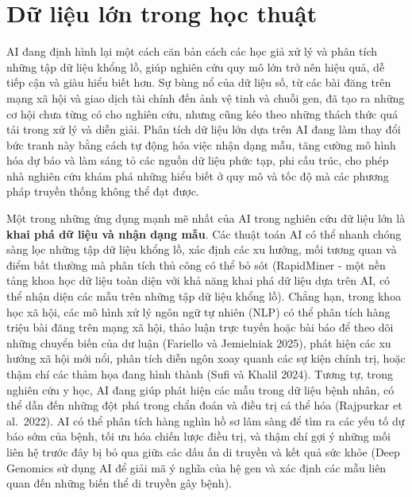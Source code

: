\section{Dữ liệu lớn trong học thuật}

AI đang định hình lại một cách căn bản cách các học giả xử lý và phân tích những tập dữ liệu khổng lồ, giúp nghiên cứu quy mô lớn trở nên hiệu quả, dễ tiếp cận và giàu hiểu biết hơn. Sự bùng nổ của dữ liệu số, từ các bài đăng trên mạng xã hội và giao dịch tài chính đến ảnh vệ tinh và chuỗi gen, đã tạo ra những cơ hội chưa từng có cho nghiên cứu, nhưng cũng kéo theo những thách thức quá tải trong xử lý và diễn giải. Phân tích dữ liệu lớn dựa trên AI đang làm thay đổi bức tranh này bằng cách tự động hóa việc nhận dạng mẫu, tăng cường mô hình hóa dự báo và làm sáng tỏ các nguồn dữ liệu phức tạp, phi cấu trúc, cho phép nhà nghiên cứu khám phá những hiểu biết ở quy mô và tốc độ mà các phương pháp truyền thống không thể đạt được.

Một trong những ứng dụng mạnh mẽ nhất của AI trong nghiên cứu dữ liệu lớn là \textbf{khai phá dữ liệu và nhận dạng mẫu}. Các thuật toán AI có thể nhanh chóng sàng lọc những tập dữ liệu khổng lồ, xác định các xu hướng, mối tương quan và điểm bất thường mà phân tích thủ công có thể bỏ sót (RapidMiner - một nền tảng khoa học dữ liệu toàn diện với khả năng khai phá dữ liệu dựa trên AI, có thể nhận diện các mẫu trên những tập dữ liệu khổng lồ). Chẳng hạn, trong khoa học xã hội, các mô hình xử lý ngôn ngữ tự nhiên (NLP) có thể phân tích hàng triệu bài đăng trên mạng xã hội, thảo luận trực tuyến hoặc bài báo để theo dõi những chuyển biến của dư luận (Fariello và Jemielniak 2025), phát hiện các xu hướng xã hội mới nổi, phân tích diễn ngôn xoay quanh các sự kiện chính trị, hoặc thậm chí các thảm họa đang hình thành (Sufi và Khalil 2024). Tương tự, trong nghiên cứu y học, AI đang giúp phát hiện các mẫu trong dữ liệu bệnh nhân, có thể dẫn đến những đột phá trong chẩn đoán và điều trị cá thể hóa (Rajpurkar et al.~2022). AI có thể phân tích hàng nghìn hồ sơ lâm sàng để tìm ra các yếu tố dự báo sớm của bệnh, tối ưu hóa chiến lược điều trị, và thậm chí gợi ý những mối liên hệ trước đây bị bỏ qua giữa các dấu ấn di truyền và kết quả sức khỏe (Deep Genomics sử dụng AI để giải mã ý nghĩa của hệ gen và xác định các mẫu liên quan đến những biến thể di truyền gây bệnh).

